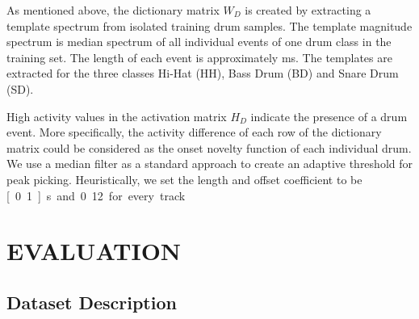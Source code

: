 \documentclass{article}
\begin{document}
As mentioned above, the dictionary matrix $W_D$ is created by extracting a template spectrum from isolated training drum samples. The template magnitude spectrum is median spectrum of all individual events of one drum class in the training set. The length of each event  is approximately \unit[80]{ms}. The templates are extracted for the three classes Hi-Hat (HH), Bass Drum (BD) and Snare Drum (SD).   

High activity values in the activation matrix $H_D$ indicate the presence of a drum event. More specifically, the activity difference of each row of the dictionary matrix could be considered as the onset novelty function of each individual drum. We use a median filter as a standard approach to create an adaptive threshold for peak picking. Heuristically, we set the length and offset coefficient to be \unit[0.1]{s} and 0.12 for every track. 
\vspace{-2mm}
\section{EVALUATION}\label{sec:Evaluation}
\subsection{Dataset Description}\label{subsec:data set description}
\end{document}
